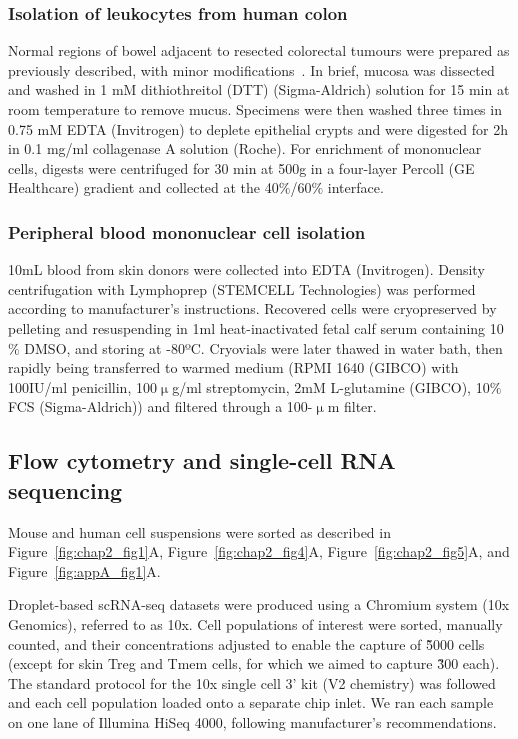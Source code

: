 \subsubsection{Isolation of leukocytes from human colon}
Normal regions of bowel adjacent to resected colorectal tumours were prepared as previously described, with minor modifications~\citep{Bettelli2006-dw,Geremia2011-gr}. In brief, mucosa was dissected and washed in 1 mM dithiothreitol (DTT) (Sigma-Aldrich) solution for 15 min at room temperature to remove mucus. Specimens were then washed three times in 0.75 mM EDTA (Invitrogen) to deplete epithelial crypts and were digested for 2h in 0.1 mg/ml collagenase A solution (Roche). For enrichment of mononuclear cells, digests were centrifuged for 30 min at 500g in a four-layer Percoll (GE Healthcare) gradient and collected at the 40${\%}$/60${\%}$ interface.

\subsubsection{Peripheral blood mononuclear cell isolation}
10mL blood from skin donors were collected into EDTA (Invitrogen). Density centrifugation with Lymphoprep (STEMCELL Technologies) was performed according to manufacturer’s instructions. Recovered cells were cryopreserved by pelleting and resuspending in 1ml heat-inactivated fetal calf serum containing 10${\%}$ DMSO, and storing at -80ºC. Cryovials were later thawed in water bath, then rapidly being transferred to warmed medium (RPMI 1640 (GIBCO) with 100IU/ml penicillin, 100${\upmu}$g/ml streptomycin, 2mM L-glutamine (GIBCO), 10${\%}$ FCS (Sigma-Aldrich)) and filtered through a 100-${\upmu}$m filter.

\subsection{Flow cytometry and single-cell RNA sequencing}
Mouse and human cell suspensions were sorted as described in Figure~\ref{fig:chap2_fig1}A, Figure~\ref{fig:chap2_fig4}A, Figure~\ref{fig:chap2_fig5}A, and Figure~\ref{fig:appA_fig1}A.

Droplet-based scRNA-seq datasets were produced using a Chromium system (10x Genomics), referred to as 10x. Cell populations of interest were sorted, manually counted, and their concentrations adjusted to enable the capture of \~5000 cells (except for skin Treg and Tmem cells, for which we aimed to capture \~300 each). The standard protocol for the 10x single cell 3’ kit (V2 chemistry) was followed and each cell population loaded onto a separate chip inlet. We ran each sample on one lane of Illumina HiSeq 4000, following manufacturer’s recommendations.

